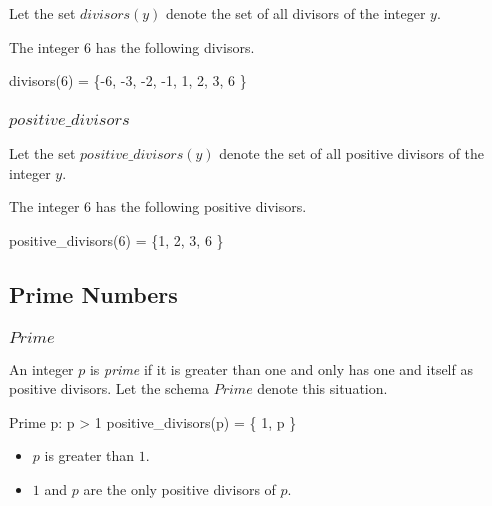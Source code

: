 \documentclass[11pt, oneside]{article}
\begin{document}
Let the set $divisors(y)$ denote the set of all divisors of the integer $y$.


\begin{example}
The integer $6$ has the following divisors.

\begin{zed}
	divisors(6) = \{-6, -3, -2, -1, 1, 2, 3, 6 \}
\end{zed}
\end{example}

\subsubsection{$positive\_divisors$}

Let the set $positive\_divisors(y)$ denote the set of all positive divisors of the integer $y$.


\begin{example}
The integer $6$ has the following positive divisors.

\begin{zed}
	positive\_divisors(6) = \{1, 2, 3, 6 \}
\end{zed}
\end{example}

\subsection{Prime Numbers}

\subsubsection{$Prime$}

An integer $p$ is \textit{prime} if it is greater than one 
and only has one and itself as positive divisors.
Let the schema $Prime$ denote this situation.

\begin{schema}{Prime}
	p: \nat
\where
	p > 1
\also
	positive\_divisors(p) = \{ 1, p \}
\end{schema}
\begin{itemize}
	\item $p$ is greater than $1$.
	\item $1$ and $p$ are the only positive divisors of $p$.
\end{itemize}
\end{document}
